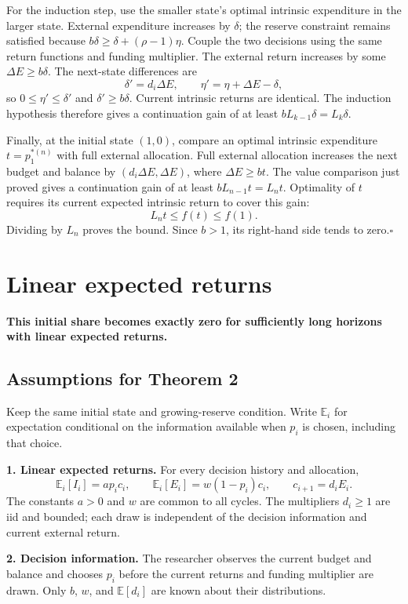 \documentclass[11pt]{article}
\begin{document}
For the induction step, use the smaller state's optimal intrinsic expenditure in the larger state. External expenditure increases by $\delta$; the reserve constraint remains satisfied because $b\delta\ge\delta+(\rho-1)\eta$. Couple the two decisions using the same return functions and funding multiplier. The external return increases by some $\Delta E\ge b\delta$. The next-state differences are
\[
 \delta'=d_i\Delta E,\qquad \eta'=\eta+\Delta E-\delta,
\]
so $0\le\eta'\le\delta'$ and $\delta'\ge b\delta$. Current intrinsic returns are identical. The induction hypothesis therefore gives a continuation gain of at least $bL_{k-1}\delta=L_k\delta$.

Finally, at the initial state $(1,0)$, compare an optimal intrinsic expenditure $t=p_1^{*(n)}$ with full external allocation. Full external allocation increases the next budget and balance by $(d_i\Delta E,\Delta E)$, where $\Delta E\ge bt$. The value comparison just proved gives a continuation gain of at least $bL_{n-1}t=L_nt$. Optimality of $t$ requires its current expected intrinsic return to cover this gain:
\[
 L_nt\le f(t)\le f(1).
\]
Dividing by $L_n$ proves the bound. Since $b>1$, its right-hand side tends to zero.\hfill$\square$

\section*{Linear expected returns}

\textbf{This initial share becomes exactly zero for sufficiently long horizons with linear expected returns.}

\subsection*{Assumptions for Theorem 2}

Keep the same initial state and growing-reserve condition. Write $\mathbb E_i$ for expectation conditional on the information available when $p_i$ is chosen, including that choice.

\textbf{1. Linear expected returns.} For every decision history and allocation,
\[
 \mathbb E_i[I_i]=a p_i c_i,\qquad \mathbb E_i[E_i]=w(1-p_i)c_i,\qquad c_{i+1}=d_iE_i.
\]
The constants $a>0$ and $w$ are common to all cycles. The multipliers $d_i\ge1$ are iid and bounded; each draw is independent of the decision information and current external return.

\textbf{2. Decision information.} The researcher observes the current budget and balance and chooses $p_i$ before the current returns and funding multiplier are drawn. Only $b$, $w$, and $\mathbb E[d_i]$ are known about their distributions.
\end{document}
